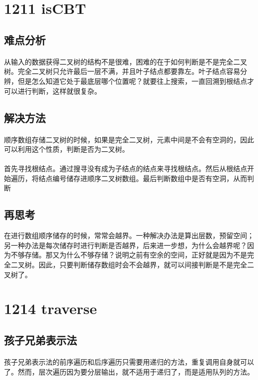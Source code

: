 \documentclass[UTF-8, 12pt]{ctexart}
\begin{document}
\section{1211 isCBT}
    \subsection{难点分析}
    \paragraph{}
    从输入的数据获得二叉树的结构不是很难，困难的在于如何判断是不是完全二叉树。完全二叉树只允许最后一层不满，并且叶子结点都要靠左。叶子结点容易分辨，但是怎么知道它处于最底层哪个位置呢？就要往上搜索，一直回溯到根结点才可以进行判断，这样就很复杂。
    \subsection{解决方法}
    \paragraph{}
    顺序数组存储二叉树的时候，如果是完全二叉树，元素中间是不会有空洞的，因此可以利用这个性质，判断是否为二叉树。
    \paragraph{}
    首先寻找根结点。通过搜寻没有成为子结点的结点来寻找根结点。然后从根结点开始遍历，将结点编号储存进顺序二叉树数组。最后判断数组中是否有空洞，从而判断
    \subsection{再思考}
    在进行数组顺序储存的时候，常常会越界。一种解决办法是算出层数，预留空间；另一种办法是每次储存时进行判断是否越界，后来进一步想，为什么会越界呢？因为不够存储。那又为什么不够存储？说明之前有空余的空间，正好就是因为不是完全二叉树。因此，只要判断储存数组时会不会越界，就可以间接判断是不是完全二叉树了。

\section{1214 traverse}
    \subsection{孩子兄弟表示法}
    \paragraph{}
    孩子兄弟表示法的前序遍历和后序遍历只需要用递归的方法，重复调用自身就可以了。然而，层次遍历因为要分层输出，就不适用于递归了，而是适用队列的方法。
\end{document}
